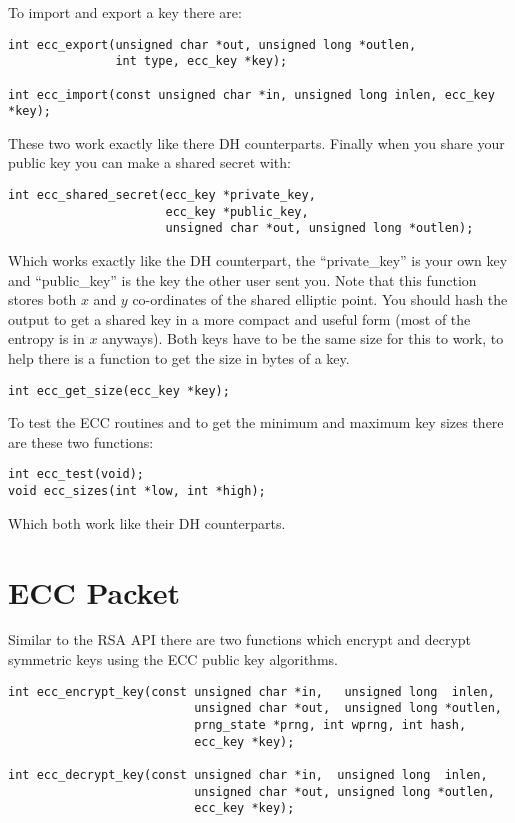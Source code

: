 \documentclass[a4paper]{book}
\begin{document}
To import and export a key there are: 
\begin{verbatim}
int ecc_export(unsigned char *out, unsigned long *outlen, 
               int type, ecc_key *key);

int ecc_import(const unsigned char *in, unsigned long inlen, ecc_key *key);
\end{verbatim}
These two work exactly like there DH counterparts.  Finally when you share your public key you can make a shared secret
with:
\begin{verbatim}
int ecc_shared_secret(ecc_key *private_key, 
                      ecc_key *public_key, 
                      unsigned char *out, unsigned long *outlen);
\end{verbatim}
Which works exactly like the DH counterpart, the ``private\_key'' is your own key and ``public\_key'' is the key the other
user sent you.   Note that this function stores both $x$ and $y$ co-ordinates of the shared
elliptic point.  You should hash the output to get a shared key in a more compact and useful form (most of the entropy is 
in $x$ anyways).  Both keys have to be the same size for this to work, to help there is a function to get the size in bytes
 of a key.
\begin{verbatim}
int ecc_get_size(ecc_key *key);
\end{verbatim}

To test the ECC routines and to get the minimum and maximum key sizes there are these two functions:
\begin{verbatim}
int ecc_test(void);
void ecc_sizes(int *low, int *high);
\end{verbatim}
Which both work like their DH counterparts.

\section{ECC Packet}
Similar to the RSA API there are two functions which encrypt and decrypt symmetric keys using the ECC public key
algorithms.

 
\begin{verbatim}
int ecc_encrypt_key(const unsigned char *in,   unsigned long  inlen,
                          unsigned char *out,  unsigned long *outlen, 
                          prng_state *prng, int wprng, int hash, 
                          ecc_key *key);

int ecc_decrypt_key(const unsigned char *in,  unsigned long  inlen,
                          unsigned char *out, unsigned long *outlen, 
                          ecc_key *key);
\end{verbatim}
\end{document}
